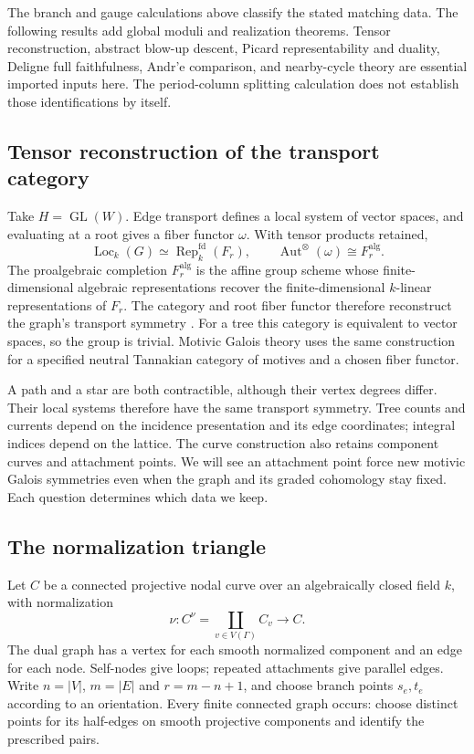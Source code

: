 \documentclass[11pt]{article}
\theoremstyle{definition}
\theoremstyle{remark}
\begin{document}
The branch and gauge calculations above classify the stated matching data. The following results add global moduli and realization theorems. Tensor reconstruction, abstract blow-up descent, Picard representability and duality, Deligne full faithfulness, Andr'e comparison, and nearby-cycle theory are essential imported inputs here. The period-column splitting calculation does not establish those identifications by itself.

\subsection{Tensor reconstruction of the transport category}

Take \(H=\operatorname{GL}(W)\). Edge transport defines a local system of vector spaces, and evaluating at a root gives a fiber functor \(\omega\). With tensor products retained,
\[
 \operatorname{Loc}_k(G)\simeq\operatorname{Rep}^{\mathrm{fd}}_k(F_r),
 \qquad
 \operatorname{Aut}^{\otimes}(\omega)\cong F_r^{\mathrm{alg}}.
\]
The proalgebraic completion \(F_r^{\mathrm{alg}}\) is the affine group scheme whose finite-dimensional algebraic representations recover the finite-dimensional \(k\)-linear representations of \(F_r\). The category and root fiber functor therefore reconstruct the graph's transport symmetry \cite{rootMilne,rootDeninger}. For a tree this category is equivalent to vector spaces, so the group is trivial. Motivic Galois theory uses the same construction for a specified neutral Tannakian category of motives and a chosen fiber functor.

A path and a star are both contractible, although their vertex degrees differ. Their local systems therefore have the same transport symmetry. Tree counts and currents depend on the incidence presentation and its edge coordinates; integral indices depend on the lattice. The curve construction also retains component curves and attachment points. We will see an attachment point force new motivic Galois symmetries even when the graph and its graded cohomology stay fixed. Each question determines which data we keep.

\subsection{The normalization triangle}
\label{sec:graph-inside-curve}

Let $C$ be a connected projective nodal curve over an algebraically closed
field $k$, with normalization
\[
 \nu:C^\nu=\coprod_{v\in V(\Gamma)}C_v\longrightarrow C.
\]
The dual graph has a vertex for each smooth normalized component and an
edge for each node. Self-nodes give loops; repeated attachments give
parallel edges. Write $n=|V|$, $m=|E|$ and $r=m-n+1$, and choose branch
points $s_e,t_e$ according to an orientation. Every finite connected graph
occurs: choose distinct points for its half-edges on smooth projective
components and identify the prescribed pairs.
\end{document}
